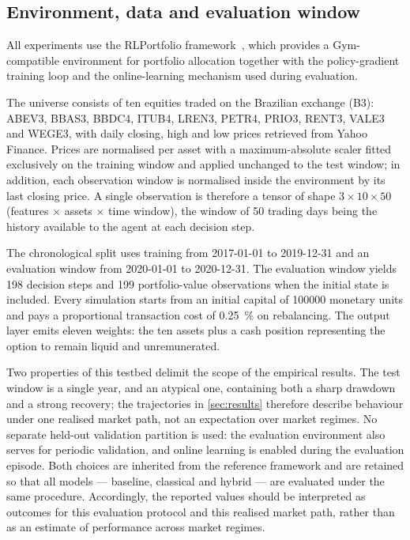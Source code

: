\documentclass[aps,floatfix,superscriptaddress,twocolumn,tightenlines,amsmath,amssymb,nofootinbib,10pt,longbibliography,prl]{revtex4-2}
\begin{document}
\subsection{Environment, data and evaluation window}
\label{subsec:dataset}

All experiments use the RLPortfolio framework~\cite{RLportfolio}, which provides a Gym-compatible environment for portfolio allocation together with the policy-gradient training loop and the online-learning mechanism used during evaluation.

The universe consists of ten equities traded on the Brazilian exchange (B3): ABEV3, BBAS3, BBDC4, ITUB4, LREN3, PETR4, PRIO3, RENT3, VALE3 and WEGE3, with daily closing, high and low prices retrieved from Yahoo Finance. Prices are normalised per asset with a maximum-absolute scaler fitted exclusively on the training window and applied unchanged to the test window; in addition, each observation window is normalised inside the environment by its last closing price. A single observation is therefore a tensor of shape $3 \times 10 \times 50$ (features $\times$ assets $\times$ time window), the window of \num{50} trading days being the history available to the agent at each decision step.

The chronological split uses training from 2017-01-01 to 2019-12-31 and an evaluation window from 2020-01-01 to 2020-12-31. The evaluation window yields \num{198} decision steps and \num{199} portfolio-value observations when the initial state is included. Every simulation starts from an initial capital of \num{100000} monetary units and pays a proportional transaction cost of \SI{0.25}{\percent} on rebalancing. The output layer emits eleven weights: the ten assets plus a cash position representing the option to remain liquid and unremunerated.

Two properties of this testbed delimit the scope of the empirical results. The test window is a single year, and an atypical one, containing both a sharp drawdown and a strong recovery; the trajectories in \ref{sec:results} therefore describe behaviour under one realised market path, not an expectation over market regimes. No separate held-out validation partition is used: the evaluation environment also serves for periodic validation, and online learning is enabled during the evaluation episode. Both choices are inherited from the reference framework and are retained so that all models --- baseline, classical and hybrid --- are evaluated under the same procedure. Accordingly, the reported values should be interpreted as outcomes for this evaluation protocol and this realised market path, rather than as an estimate of performance across market regimes.
\end{document}

